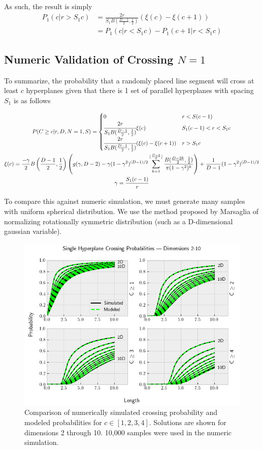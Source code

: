 \documentclass{article}
\begin{document}
As such, the result is simply
\begin{align}
	P_1(c | r>S_1c) &= \frac{2r}{S_1 B(\frac{D-1}{2}, \frac{1}{2})} (\xi(c) - \xi(c+1)) \\
	&= P_1(c | r<S_1c) - P_1(c+1 | r<S_1c)
\end{align}


\subsection{Numeric Validation of Crossing $N=1$}
To summarize, the probability that a randomly placed line segment will cross at least $c$
hyperplanes given that there is 1 set of parallel hyperplanes with spacing $S_1$ is as follows

\begin{gather}
	P(C\ge c | r, D, N=1, S) = \begin{cases}
		0 & r < S(c-1) \\ 
		\cfrac{2r}{S_1 B(\frac{D-1}{2}, \frac{1}{2})} \xi(c)  & S_1 (c-1) < r < S_1 c \\
		\cfrac{2r}{S_1 B(\frac{D-1}{2}, \frac{1}{2})} (\xi(c)-\xi(c+1)) & r > S_1c		
	\end{cases} \\
	\xi(c) = \frac{-\gamma}{2}B\left(\frac{D-1}{2}, \frac{1}{2}\right)\left(g(\gamma, D-2)-\gamma(1-\gamma^2)^{(D-1)/2}\sum_{k=1}^{\lfloor \frac{D-2}{2} \rfloor}\frac{B(\frac{D-2k}{2}, \frac{1}{2})}{\pi(1-\gamma^2)^k}\right) + \frac{1}{D-1}(1-\gamma^2)^{(D-1)/2} \\
	\gamma = \frac{S_1(c-1)}{r} 
\end{gather}

To compare this against numeric simulation, we must generate many samples with uniform spherical
distribution. We use the method proposed by Marsaglia of normalizing rotationally symmetric
distribution (such as a D-dimensional gaussian variable).

\begin{figure}[h]
	\centerline{\includegraphics[width=5in]{numeric_sim_N1.png}}
	\caption{Comparison of numerically simulated crossing probability and modeled probabilities
	for $c\in[1, 2, 3, 4]$. Solutions are shown for dimensions 2 through 10. 10,000 samples were
	used in the numeric simulation.}
	\label{fig:numeric sim N1}
\end{figure}
\end{document}
